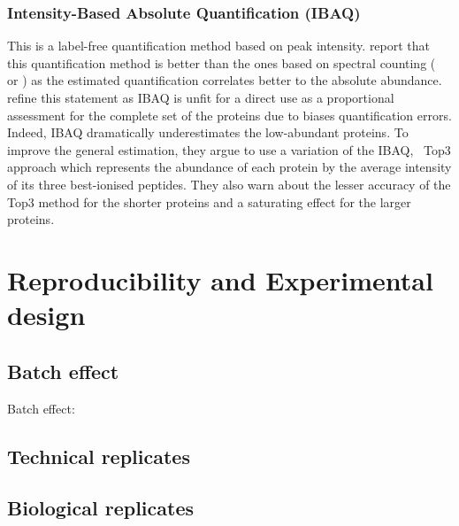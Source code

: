 



\subsubsection{Intensity-Based Absolute Quantification (IBAQ)}
This is a label-free quantification method based on peak intensity.
\cite{Arike2012} report that this quantification method is better than the ones
based on spectral counting (\eg\   or
) as the estimated quantification correlates better to
the absolute abundance.
\cite{TOP3isbetter} refine this statement as \gls{IBAQ} is unfit for a direct
use as a proportional assessment for the complete set of the proteins
due to biases quantification errors.
Indeed, \gls{IBAQ} dramatically underestimates the low-abundant proteins.
To improve the general estimation,
they argue to use a variation of the \gls{IBAQ},~\cite{Silva-Top3} Top3 approach
which represents the abundance of each protein by the average intensity of
its three best-ionised peptides.
They also warn about the lesser accuracy of the Top3 method
for the shorter proteins and a saturating effect for the larger proteins.




\section{Reproducibility and Experimental design}\label{sec:expDesign}
    \subsection{Batch effect}\label{sub:BatchEffect}
    Batch effect: 
    \subsection{Technical replicates}
    \subsection{Biological replicates}
